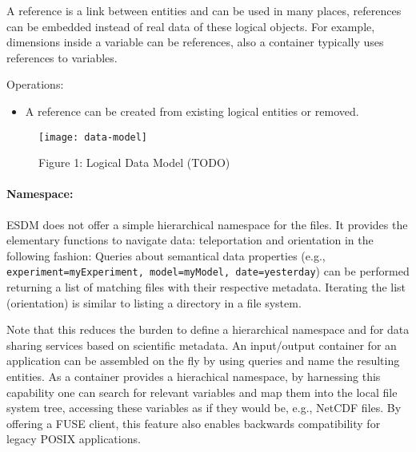 A reference is a link between entities and can be used in many places,
references can be embedded instead of real data of these logical
objects. For example, dimensions inside a variable can be references,
also a container typically uses references to variables.

Operations:

\begin{itemize}
  \item A reference can be created from existing logical entities or removed.
\end{itemize}

\begin{figure}
  \centering
  \texttt{[image: data-model]}
  \caption{Figure 1: Logical Data Model (TODO)}%
  \label{fig:data-model}
\end{figure}

\paragraph{Namespace:}%
\label{namespace}

ESDM does not offer a simple hierarchical namespace for the files. It
provides the elementary functions to navigate data: teleportation and
orientation in the following fashion: Queries about semantical data
properties (e.g.,
\texttt{experiment=myExperiment,\ model=myModel,\ date=yesterday}) can
be performed returning a list of matching files with their respective
metadata. Iterating the list (orientation) is similar to listing a
directory in a file system.

Note that this reduces the burden to define a hierarchical namespace and
for data sharing services based on scientific metadata. An input/output
container for an application can be assembled on the fly by using
queries and name the resulting entities. As a container provides a
hierachical namespace, by harnessing this capability one can search for
relevant variables and map them into the local file system tree,
accessing these variables as if they would be, e.g., NetCDF files. By
offering a FUSE client, this feature also enables backwards
compatibility for legacy POSIX applications.
